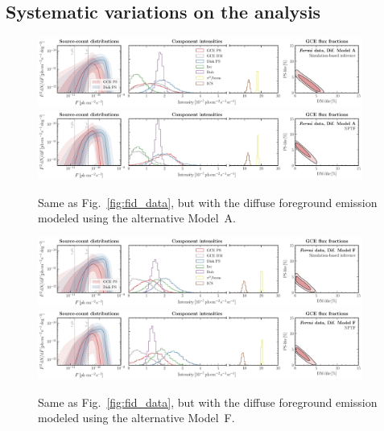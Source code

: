 \documentclass[prd,aps,10pt,nofootinbib,twocolumn,superscriptaddress,preprintnumbers,balancelastpage,longbibliography,floatfix]{revtex4-2}
\begin{document}
\subsection{Systematic variations on the analysis}
\label{sec:systematics}

%
\begin{figure}[!htbp]
\centering
\includegraphics[width=0.95\textwidth]{plots/data_fid_sbi_modelA.pdf}
\includegraphics[width=0.95\textwidth]{plots/data_fid_nptf_modelA.pdf}
\caption{Same as Fig.~\ref{fig:fid_data}, but with the diffuse foreground emission modeled using the alternative {Model~A}.}
\label{fig:fid_data_modelA}
\end{figure}
%

%
\begin{figure}[!htbp]
\centering
\includegraphics[width=0.95\textwidth]{plots/data_fid_sbi_modelF.pdf}
\includegraphics[width=0.95\textwidth]{plots/data_fid_nptf_modelF.pdf}
\caption{Same as Fig.~\ref{fig:fid_data}, but with the diffuse foreground emission modeled using the alternative {Model~F}.}
\label{fig:fid_data_modelF}
\end{figure}
%
\end{document}
